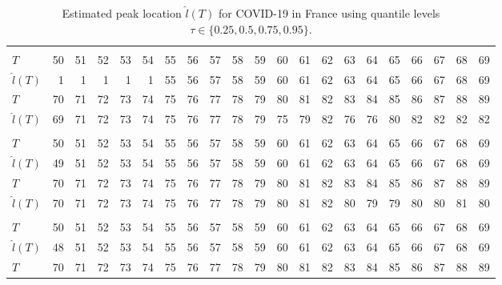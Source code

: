 \documentclass[12pt,a4paper]{article}
\begin{document}
{		\begin{landscape}
			\begin{table}[htbp]
				\caption{Estimated peak location $\hat{l}(T)$ for COVID-19 in France using quantile levels $\tau\in\{0.25,0.5,0.75,0.95\}$.}
				\label{tab:france_tau}
				\begin{tabular*}{\linewidth}{@{\extracolsep{\fill}}lrrrrrrrrrrrrrrrrrrrr}
					\toprule
					\addlinespace[2.5pt]
					\multicolumn{21}{c}{\textbf{$\tau=0.25,\ T_{\mathrm{entry}}=85,\ \varepsilon=5$}} \\
					\addlinespace[2.5pt]
					\midrule
					$T$ & 50 & 51 & 52 & 53 & 54 & 55 & 56 & 57 & 58 & 59 & 60 & 61 & 62 & 63 & 64 & 65 & 66 & 67 & 68 & 69 \\
					$\hat{l}(T)$ & 1 & 1 & 1 & 1 & 1 & 55 & 56 & 57 & 58 & 59 & 60 & 61 & 62 & 63 & 64 & 65 & 66 & 67 & 68 & 69 \\
					$T$ & 70 & 71 & 72 & 73 & 74 & 75 & 76 & 77 & 78 & 79 & 80 & 81 & 82 & 83 & 84 & 85 & 86 & 87 & 88 & 89 \\
					$\hat{l}(T)$ & 69 & 71 & 72 & 73 & 74 & 75 & 76 & 77 & 78 & 79 & 75 & 79 & 82 & 76 & 76 & 80 & 82 & 82 & 82 & 82 \\
					\midrule\addlinespace[2.5pt]
					\multicolumn{21}{c}{\textbf{$\tau=0.5,\ T_{\mathrm{entry}}=77,\ \varepsilon=5$}} \\
					\addlinespace[2.5pt]
					\midrule
					$T$ & 50 & 51 & 52 & 53 & 54 & 55 & 56 & 57 & 58 & 59 & 60 & 61 & 62 & 63 & 64 & 65 & 66 & 67 & 68 & 69 \\
					$\hat{l}(T)$ & 49 & 51 & 52 & 53 & 54 & 55 & 56 & 57 & 58 & 59 & 60 & 61 & 62 & 63 & 64 & 65 & 66 & 67 & 68 & 69 \\
					$T$ & 70 & 71 & 72 & 73 & 74 & 75 & 76 & 77 & 78 & 79 & 80 & 81 & 82 & 83 & 84 & 85 & 86 & 87 & 88 & 89 \\
					$\hat{l}(T)$ & 70 & 71 & 72 & 73 & 74 & 75 & 76 & 77 & 78 & 79 & 80 & 81 & 82 & 80 & 79 & 79 & 80 & 80 & 81 & 80 \\
					\midrule\addlinespace[2.5pt]
					\multicolumn{21}{c}{\textbf{$\tau=0.75,\ T_{\mathrm{entry}}=76,\ \varepsilon=5$}} \\
					\addlinespace[2.5pt]
					\midrule
					$T$ & 50 & 51 & 52 & 53 & 54 & 55 & 56 & 57 & 58 & 59 & 60 & 61 & 62 & 63 & 64 & 65 & 66 & 67 & 68 & 69 \\
					$\hat{l}(T)$ & 48 & 51 & 52 & 53 & 54 & 55 & 56 & 57 & 58 & 59 & 60 & 61 & 62 & 63 & 64 & 65 & 66 & 67 & 68 & 69 \\
					$T$ & 70 & 71 & 72 & 73 & 74 & 75 & 76 & 77 & 78 & 79 & 80 & 81 & 82 & 83 & 84 & 85 & 86 & 87 & 88 & 89 \\

\end{tabular*}
\end{table}
\end{landscape}}
\end{document}
